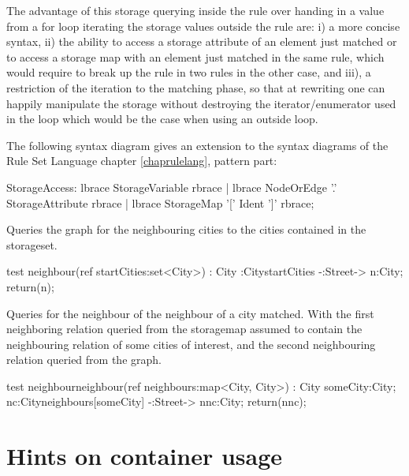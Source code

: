 The advantage of this storage querying inside the rule over handing in a value from a for loop iterating the storage values outside the rule are: i) a more concise syntax, ii) the ability to access a storage attribute of an element just matched or to access a storage map with an element just matched in the same rule, which would require to break up the rule in two rules in the other case, and iii), a restriction of the iteration to the matching phase, so that at rewriting one can happily manipulate the storage without destroying the iterator/enumerator used in the loop which would be the case when using an outside loop.

The following syntax diagram gives an extension to the syntax diagrams of the Rule Set Language chapter \ref{chaprulelang}, pattern part:
\begin{rail}
  StorageAccess:
    lbrace StorageVariable rbrace |
    lbrace NodeOrEdge '.' StorageAttribute rbrace |
    lbrace StorageMap '[' Ident ']' rbrace;
\end{rail}

\begin{example}
Queries the graph for the neighbouring cities to the cities contained in the storageset.
\begin{grgen}
test neighbour(ref startCities:set<City>) : City
{
    :City{startCities} -:Street-> n:City;
    return(n);
}
\end{grgen}
\end{example}

\begin{example}
Queries for the neighbour of the neighbour of a city matched.
With the first neighboring relation queried from the storagemap assumed to contain the neighbouring relation of some cities of interest, and the second neighbouring relation queried from the graph.
\begin{grgen}
test neighbourneighbour(ref neighbours:map<City, City>) : City
{
    someCity:City;
    nc:City{neighbours[someCity]} -:Street-> nnc:City;
    return(nnc);
}
\end{grgen}
\end{example}


\pagebreak

\section{Hints on container usage}

